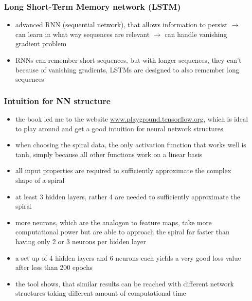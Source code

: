 \documentclass[12pt,a4paper]{article}
\begin{document}
\subsubsection{Long Short-Term Memory network (LSTM)} %
\label{ssub:long_short_term_memory_network_}
\begin{itemize}
  \item advanced RNN (sequential network), that allows information to persist
  \newline \indent $\longrightarrow$ can learn in what way sequences are relevant
  \newline \indent $\longrightarrow$ can handle vanishing gradient problem
  \item RNNs can remember short sequences, but with longer sequences, they can't because of vanishing gradients, LSTMs are designed to also remember long sequences
\end{itemize}


\subsubsection{Intuition for NN structure} %
\label{ssub:intuition_for_nn_structure}
\begin{itemize}
  \item the book \cite{geron_hands-machine_2019} led me to the website \url{www.playground.tensorflow.org}, which is ideal to play around and get a good intuition for neural network structures
  \item when choosing the spiral data, the only activation function that works well is tanh, simply because all other functions work on a linear basis
  \item all input properties are required to sufficiently approximate the complex shape of a spiral
  \item at least 3 hidden layers, rather 4 are needed to sufficiently approximate the spiral
  \item more neurons, which are the analogon to feature maps, take more computational power but are able to approach the spiral far faster than having only 2 or 3 neurons per hidden layer
  \item a set up of 4 hidden layers and 6 neurons each yields a very good loss value after less than 200 epochs
  \item the tool shows, that similar results can be reached with different network structures taking different amount of computational time
\end{itemize}
\end{document}
